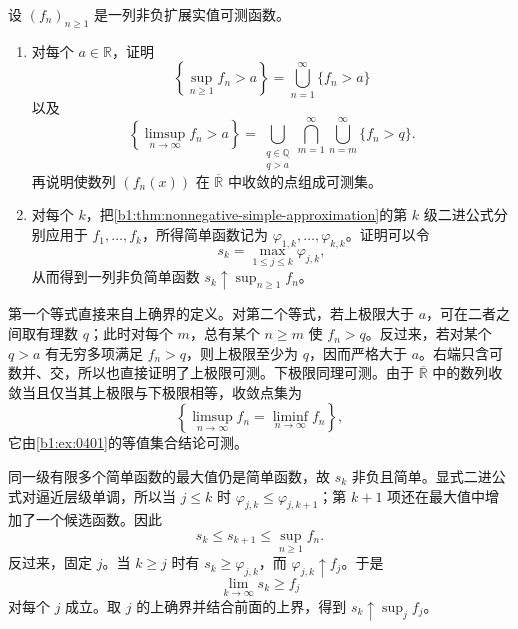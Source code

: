 \begin{exercise}\label{b1:ex:0402}
设 \((f_n)_{n\geq1}\) 是一列非负扩展实值可测函数。
\begin{enumerate}
\item 对每个 \(a\in\mathbb R\)，证明
\[
\left\{\sup_{n\geq1}f_n>a\right\}
=\bigcup_{n=1}^{\infty}\{f_n>a\}
\]
以及
\[
\left\{\limsup_{n\to\infty}f_n>a\right\}
=\bigcup_{\substack{q\in\mathbb Q\\q>a}}
  \bigcap_{m=1}^{\infty}\bigcup_{n=m}^{\infty}\{f_n>q\}.
\]
再说明使数列 \((f_n(x))\) 在 \(\overline{\mathbb R}\) 中收敛的点组成可测集。
\item 对每个 \(k\)，把\cref{b1:thm:nonnegative-simple-approximation}的第 \(k\) 级二进公式分别应用于
\(f_1,\ldots,f_k\)，所得简单函数记为 \(\varphi_{1,k},\ldots,\varphi_{k,k}\)。证明可以令
\[
s_k=\max_{1\leq j\leq k}\varphi_{j,k},
\]
从而得到一列非负简单函数 \(s_k\uparrow\sup_{n\geq1}f_n\)。
\end{enumerate}
\end{exercise}
\begin{solution}
第一个等式直接来自上确界的定义。对第二个等式，若上极限大于 \(a\)，可在二者之间取有理数 \(q\)；此时对每个 \(m\)，总有某个 \(n\geq m\) 使 \(f_n>q\)。反过来，若对某个 \(q>a\) 有无穷多项满足 \(f_n>q\)，则上极限至少为 \(q\)，因而严格大于 \(a\)。右端只含可数并、交，所以也直接证明了上极限可测。下极限同理可测。由于 \(\overline{\mathbb R}\) 中的数列收敛当且仅当其上极限与下极限相等，收敛点集为
\[
\left\{\limsup_{n\to\infty}f_n
=\liminf_{n\to\infty}f_n\right\},
\]
它由\cref{b1:ex:0401}的等值集合结论可测。

同一级有限多个简单函数的最大值仍是简单函数，故 \(s_k\) 非负且简单。显式二进公式对逼近层级单调，所以当 \(j\leq k\) 时
\(\varphi_{j,k}\leq\varphi_{j,k+1}\)；第 \(k+1\) 项还在最大值中增加了一个候选函数。因此
\[
s_k\leq s_{k+1}\leq\sup_{n\geq1}f_n.
\]
反过来，固定 \(j\)。当 \(k\geq j\) 时有
\(s_k\geq\varphi_{j,k}\)，而
\(\varphi_{j,k}\uparrow f_j\)。于是
\[
\lim_{k\to\infty}s_k\geq f_j
\]
对每个 \(j\) 成立。取 \(j\) 的上确界并结合前面的上界，得到
\(s_k\uparrow\sup_jf_j\)。
\end{solution}

